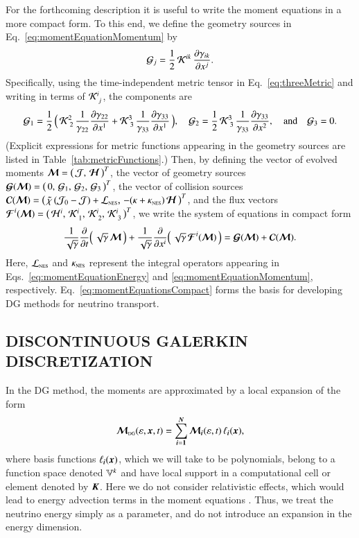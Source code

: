 \documentclass[11pt,letterpaper,twoside,english,final]{article}
\newcommand{\NES}{\mbox{\tiny NES}}
\begin{document}
For the forthcoming description it is useful to write the moment equations in a more compact form.  
To this end, we define the geometry sources in Eq.~\eqref{eq:momentEquationMomentum} by
\begin{equation}
  \mathcal{G}_{j}
  =\frac{1}{2}\,\mathcal{K}^{ik}\,\frac{\partial \gamma_{ik}}{\partial x^{j}}.  
\end{equation}
Specifically, using the time-independent metric tensor in Eq.~\eqref{eq:threeMetric} and writing in terms of $\mathcal{K}^{i}_{~j}$, the components are
\begin{equation}
  \mathcal{G}_{1}
  =\frac{1}{2}\,\Big(\,\mathcal{K}^{2}_{~2}\,\frac{1}{\gamma_{22}}\frac{\partial \gamma_{22}}{\partial x^{1}}+\mathcal{K}^{3}_{~3}\,\frac{1}{\gamma_{33}}\frac{\partial \gamma_{33}}{\partial x^{1}}\,\Big), \quad
  \mathcal{G}_{2}
  =\frac{1}{2}\,\mathcal{K}^{3}_{~3}\,\frac{1}{\gamma_{33}}\frac{\partial \gamma_{33}}{\partial x^{2}}, \quad\text{and}\quad
  \mathcal{G}_{3}
  =0.
\end{equation}
(Explicit expressions for metric functions appearing in the geometry sources are listed in Table~\ref{tab:metricFunctions}.)  
Then, by defining the vector of evolved moments $\boldsymbol{\mathcal{M}}=\big(\,\mathcal{J},\,\boldsymbol{\mathcal{H}}\,\big)^{T}$, the vector of geometry sources $\boldsymbol{\mathcal{G}}(\boldsymbol{\mathcal{M}})=\big(\,0,\,\mathcal{G}_{1},\,\mathcal{G}_{2},\,\mathcal{G}_{3}\,\big)^{T}$, the vector of collision sources $\bcC(\bcM)=\big(\,\tilde{\chi}\,(\cJ_{0}-\cJ)+\cL_{\NES},\,-(\kappa+\kappa_{\NES})\,\bcH\,\big)^{T}$, and the flux vectors $\boldsymbol{\mathcal{F}}^{i}(\boldsymbol{\mathcal{M}})=\big(\,\mathcal{H}^{i},\,\mathcal{K}_{~1}^{i},\,\mathcal{K}_{~2}^{i},\,\mathcal{K}_{~3}^{i}\,\big)^{T}$, we write the system of equations in compact form
\begin{equation}
  \frac{1}{\sqrt{\gamma}}\frac{\partial }{\partial t}\Big(\,\sqrt{\gamma}\,\boldsymbol{\mathcal{M}}\,\Big)
  +\frac{1}{\sqrt{\gamma}}\frac{\partial }{\partial x^{i}}\Big(\,\sqrt{\gamma}\,\boldsymbol{\mathcal{F}}^{i}(\boldsymbol{\mathcal{M}})\,\Big)
  =\boldsymbol{\mathcal{G}}(\boldsymbol{\mathcal{M}})+\boldsymbol{\mathcal{C}}(\boldsymbol{\mathcal{M}}).
  \label{eq:momentEquationsCompact}
\end{equation}
Here, $\cL_{\NES}$ and $\kappa_{\NES}$ represent the integral operators appearing in Eqs.~\eqref{eq:momentEquationEnergy} and \eqref{eq:momentEquationMomentum}, respectively.  
Eq.~\eqref{eq:momentEquationsCompact} forms the basis for developing DG methods for neutrino transport.  

\begin{center}
  \section{DISCONTINUOUS GALERKIN DISCRETIZATION}
  \label{sec:dgMethod}
\end{center}

In the DG method, the moments are approximated by a local expansion of the form
\begin{equation}
  \boldsymbol{\mathcal{M}}_{\mbox{\tiny DG}}(\varepsilon,\boldsymbol{x},t)
  =\sum_{\boldsymbol{i}=\boldsymbol{1}}^{\boldsymbol{N}}\boldsymbol{\mathcal{M}}_{\boldsymbol{i}}(\varepsilon,t)\,\ell_{\boldsymbol{i}}(\boldsymbol{x}), 
\end{equation}
where basis functions $\ell_{\boldsymbol{i}}(\boldsymbol{x})$, which we will take to be polynomials, belong to a function space denoted $\mathbb{V}^{k}$ and have local support in a computational cell or element denoted by $\boldsymbol{K}$.  
Here we do not consider relativistic effects, which would lead to energy advection terms in the moment equations \citep[cf.][]{cardall_etal_2013a}.  
Thus, we treat the neutrino energy simply as a parameter, and do not introduce an expansion in the energy dimension.  
\end{document}
